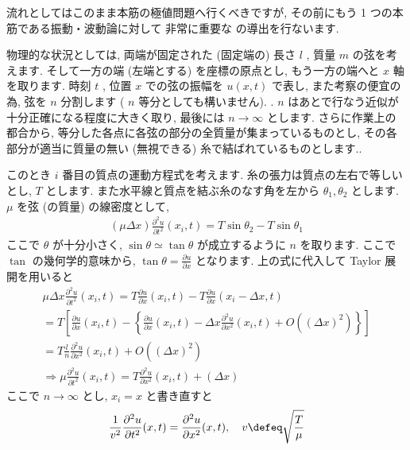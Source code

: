 \documentclass[openany, a4paper, oneside]{jsbook}
\begin{document}
流れとしてはこのまま本筋の極値問題へ行くべきですが, その前にもう 1 つの本筋である振動・波動論に対して
非常に重要な
の導出を行ないます.

物理的な状況としては, 両端が固定された (固定端の) 長さ $l$ , 質量 $m$ の弦を考えます.
そして一方の端 (左端とする) を座標の原点とし, もう一方の端へと $x$ 軸を取ります.
時刻 $t$ , 位置 $x$ での弦の振幅を $u (x,t)$ で表し,
また考察の便宜の為, 弦を $n$ 分割します ( $n$ 等分としても構いません). .
$n$ はあとで行なう近似が十分正確になる程度に大きく取り, 最後には $n \to \infty$ とします.
さらに作業上の都合から, 等分した各点に各弦の部分の全質量が集まっているものとし,
その各部分が適当に質量の無い (無視できる) 糸で結ばれているものとします..

このとき $i$ 番目の質点の運動方程式を考えます. 糸の張力は質点の左右で等しいとし,  $T$ とします.
また水平線と質点を結ぶ糸のなす角を左から $\theta_1,\theta_2$ とします.
$\mu$ を弦 (の質量) の線密度として,
\begin{align}
( \mu \varDelta x) \frac{\partial ^2 u} {\partial t ^2} (x_i , t )
=
T \sin \theta_2 - T \sin \theta_1
\end{align}
ここで $\theta$ が十分小さく,  $\sin \theta \simeq \tan \theta$ が成立するように $n$ を取ります.
ここで $\tan$ の幾何学的意味から,  $\tan \theta = \frac {\partial u} {\partial x}$ となります.
上の式に代入して Taylor 展開を用いると
\begin{gather}
\mu \varDelta x \frac{\partial ^2 u} {\partial t ^2} (x_i , t )
=
T \frac{\partial u} {\partial x}(x_i , t) - T \frac{\partial u} {\partial x}\left ( x_i - \varDelta x , t \right) \\
=
T \left [
\frac{\partial u} {\partial x}(x_i , t)
-\left \{
\frac{\partial u} {\partial x} ( x_i , t ) - \varDelta x \frac{\partial ^2 u} {\partial x^2} ( x_i , t )
+O \left ( \left ( \varDelta x \right) ^2 \right)
\right \}
\right ]\\
=
T \frac{l} {n} \frac{\partial ^2 u} {\partial  x ^2}(x_i , t ) + O \left ( \left ( \varDelta x \right) ^2 \right)\\
\Longrightarrow
\mu \frac{\partial ^2 u} {\partial t ^2} (x_i , t )
=
T \frac{\partial ^2 u} {\partial  x ^2}(x_i , t ) + \left ( \varDelta x \right)
\end{gather}
ここで $n \to \infty$ とし,  $x_i = x$ と書き直すと
\begin{align}
\frac{1} {v^2} \frac{\partial ^2 u} {\partial t ^2} (x , t )
=
\frac{\partial ^2 u} {\partial  x ^2}(x , t ),
\quad
v \defeq \sqrt \frac{T} {\mu}
\end{align}
\end{document}
